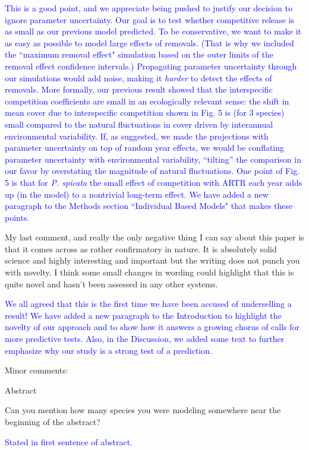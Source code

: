 \documentclass[12pt]{article}
\newcommand{\response}{\textcolor{blue}}
\begin{document}
\response{ This is a good point, and we appreciate being pushed to justify our decision to ignore parameter uncertainty. Our goal is to test
whether competitive release is as small as our previous model predicted. To be conservative, we want to make it as easy as possible to
model large effects of removals. (That is why we included the ``maximum removal effect" simulation based on the outer limits of the removal effect
confidence intervals.) Propagating parameter uncertainty through our simulations would add noise, making it \emph{harder} to 
detect the effects of removals. More formally, our previous result showed that the interspecific competition coefficients are small in an ecologically
relevant sense: the shift in mean cover due to interspecific competition shown in Fig. 5 is (for 3 species) small compared to the natural fluctuations in cover driven by interannual environmental variability. 
If, as suggested, we made the projections with parameter uncertainty on top of random year effects, we would be conflating parameter uncertainty with environmental variability, ``tilting'' the
comparison in our favor by overstating the magnitude of natural fluctuations. One point of Fig. 5 is that for \emph{P. spicata} the small effect of competition with ARTR each year adds up (in the model) to a nontrivial long-term effect. We have added a new paragraph to the Methods section ``Individual Based Models" that makes these points. }

 
My last comment, and really the only negative thing I can say about this paper is that it comes across as rather confirmatory in nature. It is absolutely solid science and 
highly interesting and important but the writing does not punch you with novelty. I think some small changes in wording could highlight that this is quite novel and hasn't 
been assessed in any other systems. 

\response{We all agreed that this is the first time we have been accused of underselling a result! We have added a new paragraph to the Introduction
to highlight the novelty of our approach and to show how it answers a growing chorus of calls for more predictive tests. Also, in the Discussion, we 
added some text to further emphasize why our study is a strong test of a prediction. }

Minor comments:

Abstract

Can you mention how many species you were modeling somewhere near the beginning of the abstract?

\response{Stated in first sentence of abstract.}
\end{document}

